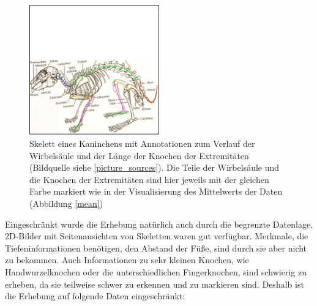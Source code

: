  \begin{figure}
  \centering
  \includegraphics[width=0.5\textwidth]{../PCA/Skelettbilder/Kaninchen_farbig.png}
  \caption{Skelett eines Kaninchens mit Annotationen zum Verlauf der Wirbelsäule und der Länge der Knochen der Extremitäten (Bildquelle siehe \ref{picture_sources}). Die Teile der Wirbelsäule und die Knochen der Extremitäten sind hier jeweils mit der gleichen Farbe markiert wie in der Visualisierung des Mittelwerts der Daten (Abbildung \ref{mean})}
  \label{kaninchen}
 \end{figure}

 Eingeschränkt wurde die Erhebung natürlich auch durch die begrenzte Datenlage. 2D-Bilder mit Seitenansichten von Skeletten waren gut verfügbar. Merkmale, die Tiefeninformationen benötigen, \zb den Abstand der Füße, sind durch sie aber nicht zu bekommen. Auch Informationen zu sehr kleinen Knochen, wie Handwurzelknochen oder die unterschiedlichen Fingerknochen, sind schwierig zu erheben, da sie teilweise schwer zu erkennen und zu markieren sind. 
 Deshalb ist die Erhebung auf folgende Daten eingeschränkt:
  
